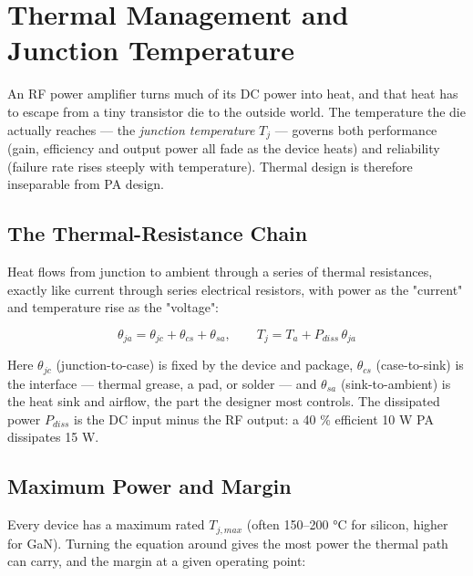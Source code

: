 \section{Thermal Management and Junction Temperature}\label{sec:wiki_thermal}



An RF power amplifier turns much of its DC power into heat, and that heat has to escape from a tiny transistor die to the outside world. The temperature the die actually reaches — the \emph{junction temperature} $T_j$ — governs both performance (gain, efficiency and output power all fade as the device heats) and reliability (failure rate rises steeply with temperature). Thermal design is therefore inseparable from PA design.

      

\subsection{The Thermal-Resistance Chain}

      

Heat flows from junction to ambient through a series of thermal resistances, exactly like current through series electrical resistors, with power as the "current" and temperature rise as the "voltage":


      
\[\theta_{ja} = \theta_{jc} + \theta_{cs} + \theta_{sa},\qquad T_j = T_a + P_{diss}\,\theta_{ja}\]

      

Here $\theta_{jc}$ (junction-to-case) is fixed by the device and package, $\theta_{cs}$ (case-to-sink) is the interface — thermal grease, a pad, or solder — and $\theta_{sa}$ (sink-to-ambient) is the heat sink and airflow, the part the designer most controls. The dissipated power $P_{diss}$ is the DC input minus the RF output: a 40 \% efficient 10 W PA dissipates 15 W.

      

\subsection{Maximum Power and Margin}

      

Every device has a maximum rated $T_{j,max}$ (often 150–200 °C for silicon, higher for GaN). Turning the equation around gives the most power the thermal path can carry, and the margin at a given operating point:

